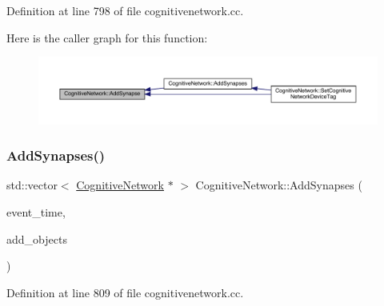 Definition at line 798 of file cognitivenetwork.\+cc.

Here is the caller graph for this function\+:
\nopagebreak
\begin{figure}[H]
\begin{center}
\leavevmode
\includegraphics[width=350pt]{class_cognitive_network_a4bfdcd2affdfe2adb2da68dba60dff0e_icgraph}
\end{center}
\end{figure}
\mbox{\label{class_cognitive_network_a09d9e01cbd8596af7fac626ce2753643}} 
\subsubsection{\texorpdfstring{Add\+Synapses()}{AddSynapses()}}
{\footnotesize\ttfamily std\+::vector$<$ \hyperlink{class_cognitive_network}{Cognitive\+Network} $\ast$ $>$ Cognitive\+Network\+::\+Add\+Synapses (\begin{DoxyParamCaption}\item[{std\+::chrono\+::time\+\_\+point$<$ \hyperlink{universe_8h_a0ef8d951d1ca5ab3cfaf7ab4c7a6fd80}{Clock} $>$}]{event\+\_\+time,  }\item[{std\+::vector$<$ \hyperlink{class_cognitive_network}{Cognitive\+Network} $\ast$$>$}]{add\+\_\+objects }\end{DoxyParamCaption})}



Definition at line 809 of file cognitivenetwork.\+cc.

